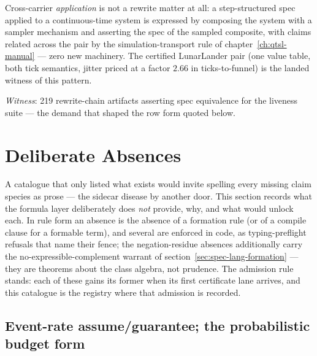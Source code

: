Cross-carrier \emph{application} is not a rewrite matter at all: a
step-structured spec applied to a continuous-time system is expressed
by composing the system with a sampler mechanism and asserting the
spec of the sampled composite, with claims related across the pair by
the simulation-transport rule of chapter~\ref{ch:qtsl-manual} ---
zero new machinery. The certified LunarLander pair (one value table,
both tick semantics, jitter priced at a factor $2.66$ in
ticks-to-funnel) is the landed witness of this pattern.

\emph{Witness}: 219 rewrite-chain artifacts asserting spec
equivalence for the liveness suite --- the demand that shaped the row
form quoted below.



\section{Deliberate Absences}
\label{sec:spec-lang-fences}

A catalogue that only listed what exists would invite spelling every
missing claim species as prose --- the sidecar disease by another
door. This section records what the formula layer deliberately does
\emph{not} provide, why, and what would unlock each. In rule form an
absence is the absence of a formation rule (or of a compile clause
for a formable term), and several are enforced in code, as
typing-preflight refusals that name their fence; the negation-residue
absences additionally carry the no-expressible-complement warrant of
section~\ref{sec:spec-lang-formation} --- they are theorems about
the class algebra, not prudence. The admission rule stands: each of
these gains its former when its first certificate lane arrives, and
this catalogue is the registry where that admission is recorded.

\subsection{Event-rate assume/guarantee; the probabilistic budget
form}
\label{sec:spec-lang-frate}



